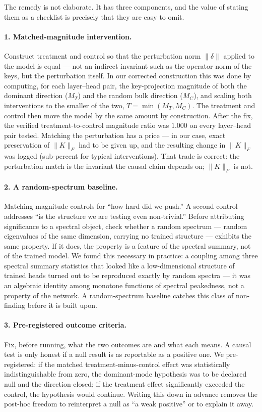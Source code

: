 \documentclass[11pt]{article}
\begin{document}
The remedy is not elaborate. It has three components, and the value of
stating them as a checklist is precisely that they are easy to omit.

\paragraph{1. Matched-magnitude intervention.}
Construct treatment and control so that the perturbation norm
$\|\delta\|$ applied to the model is equal --- not an indirect invariant
such as the operator norm of the keys, but the perturbation itself. In
our corrected construction this was done by computing, for each
layer--head pair, the key-projection magnitude of both the dominant
direction ($M_T$) and the random bulk direction ($M_C$), and scaling both
interventions to the smaller of the two, $T=\min(M_T,M_C)$. The treatment
and control then move the model by the same amount by construction. After
the fix, the verified treatment-to-control magnitude ratio was $1.000$ on
every layer--head pair tested. Matching the perturbation has a price ---
in our case, exact preservation of $\|K\|_F$ had to be given up, and the
resulting change in $\|K\|_F$ was logged (sub-percent for typical
interventions). That trade is correct: the perturbation match is the
invariant the causal claim depends on; $\|K\|_F$ is not.

\paragraph{2. A random-spectrum baseline.}
Matching magnitude controls for ``how hard did we push.'' A second control
addresses ``is the structure we are testing even non-trivial.'' Before
attributing significance to a spectral object, check whether a random
spectrum --- random eigenvalues of the same dimension, carrying no trained
structure --- exhibits the same property. If it does, the property is a
feature of the spectral summary, not of the trained model. We found this
necessary in practice: a coupling among three spectral summary statistics
that looked like a low-dimensional structure of trained heads turned out
to be reproduced exactly by random spectra --- it was an algebraic
identity among monotone functions of spectral peakedness, not a property
of the network. A random-spectrum baseline catches this class of
non-finding before it is built upon.

\paragraph{3. Pre-registered outcome criteria.}
Fix, before running, what the two outcomes are and what each means. A
causal test is only honest if a null result is as reportable as a
positive one. We pre-registered: if the matched treatment-minus-control
effect was statistically indistinguishable from zero, the dominant-mode
hypothesis was to be declared null and the direction closed; if the
treatment effect significantly exceeded the control, the hypothesis would
continue. Writing this down in advance removes the post-hoc freedom to
reinterpret a null as ``a weak positive'' or to explain it away.
\end{document}
